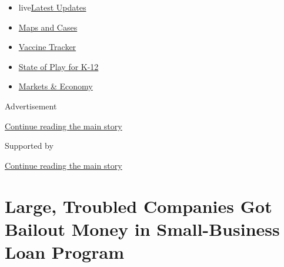 \begin{itemize}
\tightlist
\item
  live\href{https://www.nytimes3xbfgragh.onion/2020/08/17/world/coronavirus-covid.html?name=styln-coronavirus-markets\&region=TOP_BANNER\&variant=undefined\&block=storyline_menu_recirc\&action=click\&pgtype=Article\&impression_id=b17256f1-e108-11ea-9c1d-631a2322174c}{Latest
  Updates}
\item
  \href{https://www.nytimes3xbfgragh.onion/interactive/2020/us/coronavirus-us-cases.html?name=styln-coronavirus-markets\&region=TOP_BANNER\&variant=undefined\&block=storyline_menu_recirc\&action=click\&pgtype=Article\&impression_id=b17256f2-e108-11ea-9c1d-631a2322174c}{Maps
  and Cases}
\item
  \href{https://www.nytimes3xbfgragh.onion/interactive/2020/science/coronavirus-vaccine-tracker.html?name=styln-coronavirus-markets\&region=TOP_BANNER\&variant=undefined\&block=storyline_menu_recirc\&action=click\&pgtype=Article\&impression_id=b17256f3-e108-11ea-9c1d-631a2322174c}{Vaccine
  Tracker}
\item
  \href{https://www.nytimes3xbfgragh.onion/2020/08/17/us/k-12-schools-reopening.html?name=styln-coronavirus-markets\&region=TOP_BANNER\&variant=undefined\&block=storyline_menu_recirc\&action=click\&pgtype=Article\&impression_id=b17256f4-e108-11ea-9c1d-631a2322174c}{State
  of Play for K-12}
\item
  \href{https://www.nytimes3xbfgragh.onion/live/2020/08/17/business/stock-market-today-coronavirus?name=styln-coronavirus-markets\&region=TOP_BANNER\&variant=undefined\&block=storyline_menu_recirc\&action=click\&pgtype=Article\&impression_id=b17256f5-e108-11ea-9c1d-631a2322174c}{Markets
  \& Economy}
\end{itemize}

Advertisement

\protect\hyperlink{after-top}{Continue reading the main story}

Supported by

\protect\hyperlink{after-sponsor}{Continue reading the main story}

\hypertarget{large-troubled-companies-got-bailout-money-in-small-business-loan-program}{%
\section{Large, Troubled Companies Got Bailout Money in Small-Business
Loan
Program}\label{large-troubled-companies-got-bailout-money-in-small-business-loan-program}}

